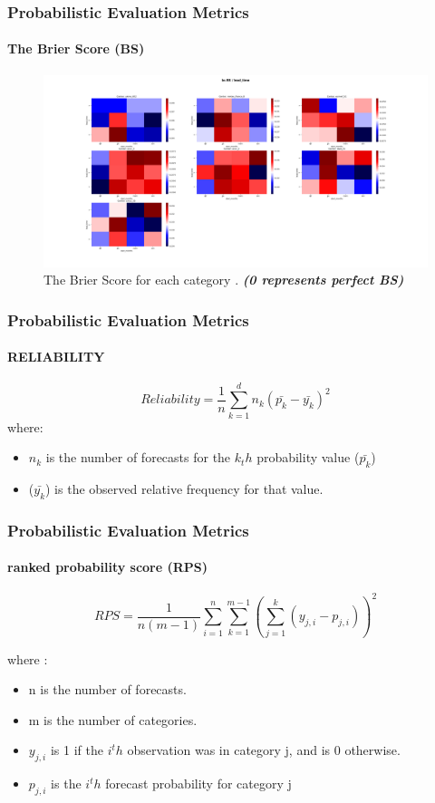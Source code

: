 \begin{frame}
\frametitle{Probabilistic Evaluation Metrics}
\framesubtitle{The Brier Score (BS)}
\begin{figure}[H]
    \centering
    \includegraphics[scale=0.15]{bs_RR_lead_time.png}
    \caption{The Brier Score for each category  . \textbf{\textit{(0 represents perfect BS)}}}
\end{figure}
\end{frame}




\begin{frame}
\frametitle{Probabilistic Evaluation Metrics}
\framesubtitle{RELIABILITY}

$$Reliability=\frac{1}{n} \sum\limits_{k=1}^{d} n_k(\bar{p_k}-\bar{y_k})^2$$
where:
\begin{itemize}
	\item $n_k$ is the number of forecasts for the $k_th$ probability value ($\bar{p_k}$)
	\item ($\bar{y_k}$) is the observed relative frequency for that value.
\end{itemize} 
\end{frame}




\begin{frame}
\frametitle{Probabilistic Evaluation Metrics}
\framesubtitle{ranked probability score (RPS)}


$$RPS=\frac{1}{n(m-1)}\sum\limits_{i=1}^{n} \sum\limits_{k=1}^{m-1} \left(\sum\limits_{j=1}^{k}(y_{j,i} - p_{j,i})\right)^2  $$

where : 

\begin{itemize}
	\item n is the number of forecasts.
	\item m is the number of categories.
	\item $y_{j,i}$ is 1 if the $i^th$ observation was in category j, and is 0 otherwise.
	\item $p_{j,i}$ is the $i^th$ forecast probability for category j
\end{itemize}
\end{frame}


